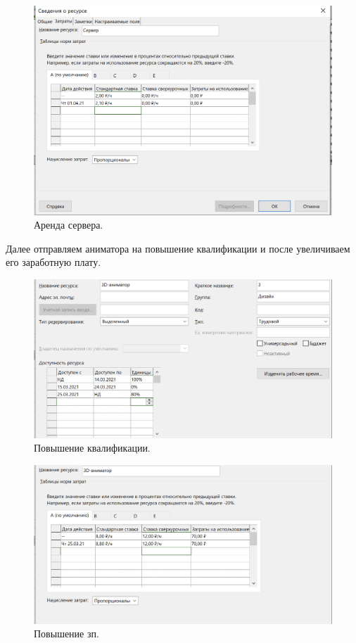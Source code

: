 \documentclass[a4paper,14pt]{extreport} %
\begin{document}
\begin{enumerate}
\begin{figure}[H]
  \centering
  \caption{Аренда сервера. }
  \includegraphics[scale=0.7]{2}
\end{figure}

Далее отправляем аниматора на повышение квалификации и после увеличиваем его заработную плату.

\begin{figure}[H]
  \centering
  \caption{Повышение квалификации. }
  \includegraphics[scale=0.7]{3}
\end{figure}

\begin{figure}[H]
  \centering
  \caption{Повышение зп. }
  \includegraphics[scale=0.7]{6}
\end{figure}


\end{enumerate}
\end{document}
